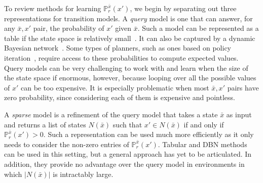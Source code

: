 \documentclass[letterpaper]{article} %
\begin{document}
To review methods for learning $\mathbb{P}^{\bar{x}}_{r}(x')$, we begin by separating out three representations for transition models. A \emph{query}
model is one that can answer, for any $\bar{x},x'$ pair, the probability of $x'$ given $\bar{x}$. Such a model can be represented as a table if the state space is relatively small~\cite{kearns02}. It can also be captured by a dynamic Bayesian network~\cite{kearns99d,degris2006learning}.
Some types of planners, such as ones based on policy iteration~\cite{Puterman94}, require access to these probabilities to compute expected values. 
Query models can be very challenging to work with and learn when the size of the state space if enormous, however, because looping over all the possible values of $x'$ can be too expensive. It is especially problematic when most $\bar{x},x'$ pairs have zero probability, since considering each of them is expensive and pointless.

A \emph{sparse} model is a refinement of the query model that takes a state $\bar{x}$ as input and returns a list of states $N(\bar{x})$ such that $x' \in N(\bar{x})$ if and only if $\mathbb{P}^{\bar{x}}_{r}(x')>0$. Such a representation can be used much more efficiently as it only needs to consider the non-zero entries of $\mathbb{P}^{\bar{x}}_{r}(x')$. Tabular and DBN methods can be used in this setting, but a general approach has yet to be articulated. In addition, they provide no advantage over the query model in environments in which $|N(\bar{x})|$ is intractably large.
\end{document}
